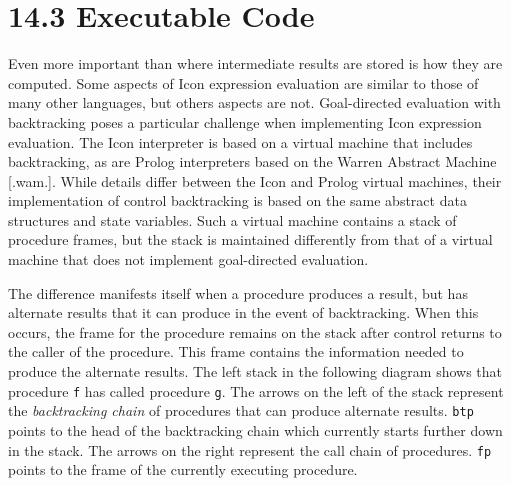 \section[14.3 Executable Code]{14.3 Executable Code}

Even more important than where intermediate results are stored is how
they are computed. Some aspects of Icon expression evaluation are
similar to those of many other languages, but others aspects are
not. Goal-directed evaluation with backtracking poses a particular
challenge when implementing Icon expression evaluation. The Icon
interpreter is based on a virtual machine that includes backtracking,
as are Prolog interpreters based on the Warren Abstract Machine
[.wam.]. While details differ between the Icon and Prolog virtual
machines, their implementation of control backtracking is based on the
same abstract data structures and state variables. Such a virtual
machine contains a stack of procedure frames, but the stack is
maintained differently from that of a virtual machine that does not
implement goal-directed evaluation.

The difference manifests itself when a procedure produces a result,
but has alternate results that it can produce in the event of
backtracking. When this occurs, the frame for the procedure remains on
the stack after control returns to the caller of the procedure. This
frame contains the information needed to produce the alternate
results. The left stack in the following diagram shows that procedure
\texttt{f} has called procedure \texttt{g}. The arrows on the left of
the stack represent the \textit{backtracking chain} of procedures that
can produce alternate results. \texttt{btp} points to the head of the
backtracking chain which currently starts further down in the
stack. The arrows on the right represent the call chain of procedures.
\texttt{fp} points to the frame of the currently executing procedure.

